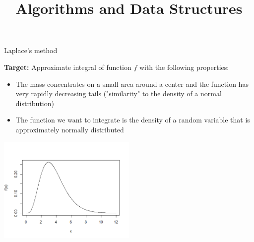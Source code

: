 \documentclass[11pt,compress,t,notes=noshow, xcolor=table]{beamer}
\title{Algorithms and Data Structures}
\begin{document}


\begin{vbframe}{Laplace's method}


\textbf{Target:} Approximate integral of function $f$ with the following properties:

\begin{itemize}
\item The mass concentrates on a small area around a center and the function has very rapidly decreasing tails
("similarity" to the density of a normal distribution)
\item The function we want to integrate is the density of a random variable that is approximately normally distributed
\end{itemize}

%
%


\begin{center}
\includegraphics[width =0.5\textwidth]{figure_man/normaldist.png}
\end{center}



\end{vbframe}
\end{document}
